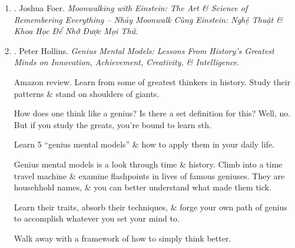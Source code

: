 \documentclass{article}
\begin{document}
\begin{enumerate}
\begin{itemize}
		\item ``{\sc Joshua Foer} proves what few of us are willing to get our heads around: there's more room in our brains that we ever imagined. {\it Moonwalking with {\sc Einstein}} isn't a how-to guide to remembering a name or where you put your keys. It's a riveting exploration of humankind's centuries-old obsession with memory, \& 1 man's improbable quest to master his own.'' -- {\sc Stefan Fatsis}, author of {\it A Few Seconds of Panic \& Word Freak}
	\end{itemize}
	{\sf About the Author.} {\sc Joshua Foer} was born in Washington, DC in 1982 \& lives in New Haven, CT with his wife Dinah. His writing has appeared in {\it National Geographic, Esquire, Slate, Outside, New York Times}, \& other publications. He is the co-founder of the Atlas Obscura, an online guide to the world's wonders \& curiosities. He is also the co-founder of the architectural design competition, Sukkah City. {\it Moonwalking with {\sc Einstein}} is his 1st book.

	\item \cite{Foer_remember_VN}. {\sc Joshua Foer}. {\it Moonwalking with Einstein: The Art \& Science of Remembering Everything -- Nhảy Moonwalk Cùng Einstein: Nghệ Thuật \& Khoa Học Để Nhớ Được Mọi Thứ}.\hfill{\sf[done]}

	\item \cite{Hollins_genius_mental_models}. {\sc Peter Hollins}. {\it Genius Mental Models: Lessons From History's Greatest Minds on Innovation, Achievement, Creativity, \& Intelligence}. {}

	{\sf Amazon review.} Learn from some of greatest thinkers in history. Study their patterns \& stand on shoulders of giants.

	How does one think like a genius? Is there a set definition for this? Well, no. But if you study the greats, you're bound to learn sth.

	Learn 5 ``genius mental models'' \& how to apply them in your daily life.

	Genius mental models is a look through time \& history. Climb into a time travel machine \& examine flashpoints in lives of famous geniuses. They are househhold names, \& you can better understand what made them tick.

	Learn their traits, absorb their techniques, \& forge your own path of genius to accomplish whatever you set your mind to.

	Walk away with a framework of how to simply think better.


\end{enumerate}
\end{document}
